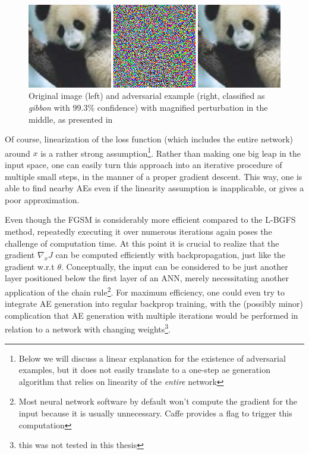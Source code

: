 \documentclass[11pt, a4paper]{article}
\begin{document}
\begin{figure}[htb]
	\centering
	\includegraphics[width=\textwidth]{images/harnessing_ae.png}
	\caption{Original image (left) and adversarial example (right, classified as \emph{gibbon} with $99.3\%$ confidence) with magnified perturbation in the middle, as presented in \cite{explaining-and-harnessing-adversarial-examples}}
	\label{fig:harnessing-ae}
\end{figure}

Of course, linearization of the loss function (which includes the entire network) around $x$ is a rather strong assumption\footnote{Below we will discuss a linear explanation for the existence of adversarial examples, but it does not easily translate to a one-step ae generation algorithm that relies on linearity of the \emph{entire} network}. Rather than making one big leap in the input space, one can easily turn this approach into an iterative procedure of multiple small steps, in the manner of a proper gradient descent. This way, one is able to find nearby AEs even if the linearity assumption is inapplicable, or gives a poor approximation.


Even though the FGSM is considerably more efficient compared to the L-BGFS method, repeatedly executing it over numerous iterations again poses the challenge of computation time. At this point it is crucial to realize that the gradient $\nabla_x J$ can be computed efficiently with backpropagation, just like the gradient w.r.t $\theta$. Conceptually, the input can be considered to be just another layer positioned below the first layer of an ANN, merely necessitating another application of the chain rule\footnote{Most neural network software by default won't compute the gradient for the input because it is usually unnecessary. Caffe provides a flag to trigger this computation}. For maximum efficiency, one could even try to integrate AE generation into regular backprop training, with the (possibly minor) complication that AE generation with multiple iterations would be performed in relation to a network with changing weights\footnote{this was not tested in this thesis}.
\end{document}
